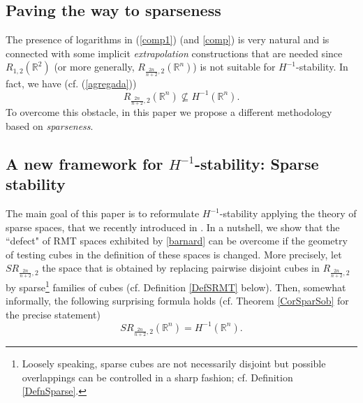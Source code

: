 \documentclass[11pt, a4paper,leqno]{amsart}
\theoremstyle{plain}
\numberwithin{equation}{section}
\theoremstyle{definition}
\theoremstyle{remark}
\def\R{\mathbb{R}}
\begin{document}
\subsection{Paving the way to sparseness}\label{SectionPaving}

The presence of logarithms in (\ref{comp1}) (and \eqref{comp}) is very natural and is connected
with some implicit \emph{extrapolation} constructions that are needed since
$R_{1,2}(\mathbb{R}^{2})$ (or more generally,  $R_{\frac{2n}{n+2}%
,2}(\mathbb{R}^{n})$) is not suitable for $H^{-1}$-stability. In
fact, we have (cf. (\ref{agregada}))
\begin{equation}
R_{\frac{2n}{n+2},2}(\mathbb{R}^{n})\nsubseteq H^{-1}(\mathbb{R}%
^{n}).\label{barnard}%
\end{equation}
To overcome this obstacle, in this paper we propose a different methodology
based on \emph{sparseness}. 








\subsection{A new framework for $H^{-1}$-stability: Sparse stability}

The main goal of this paper is to reformulate $H^{-1}$-stability applying  the theory of 
sparse spaces, that we recently introduced in \cite{DMComptes}. In a nutshell, we show that the ``defect" of RMT spaces exhibited  by  \eqref{barnard} can be overcome if the geometry of testing cubes in the definition of these spaces is changed. More precisely, let $SR_{\frac{2n}{n+2},2}$ the space that is obtained by replacing  pairwise disjoint cubes in $R_{\frac{2n}{n+2},2}$   by sparse\footnote{Loosely speaking, sparse cubes are not necessarily disjoint but possible overlappings can be controlled in a sharp fashion; cf. Definition \ref{DefnSparse}.} families of cubes (cf.  Definition \ref{DefSRMT} below). Then, somewhat informally, the following surprising formula holds (cf. Theorem \ref{CorSparSob} for the precise statement)
\begin{equation}\label{SNS}
	SR_{\frac{2n}{n+2},2}(\R^n) = H^{-1}(\R^n). 
\end{equation}


%
\end{document}
